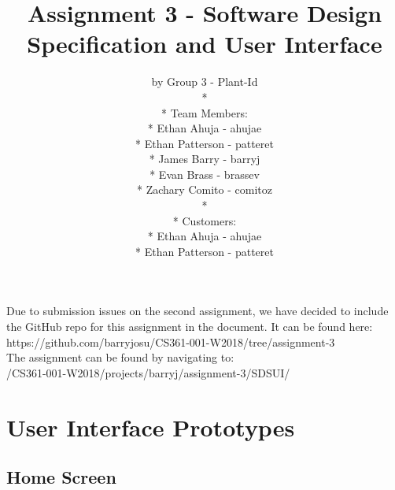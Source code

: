\documentclass[a4paper]{article}
\title{Assignment 3 - Software Design Specification and User Interface}
\author{ by Group 3 - Plant-Id \\* \\* Team Members: \\* Ethan Ahuja - ahujae \\* Ethan Patterson - patteret \\* James Barry - barryj \\* Evan Brass - brassev \\* Zachary Comito - comitoz \\* \\* Customers: \\* Ethan Ahuja - ahujae \\* Ethan Patterson - patteret }
\begin{document}
\maketitle
\pagebreak
\tableofcontents
\pagebreak
Due to submission issues on the second assignment, we have decided to include the GitHub repo for this assignment in the document. It can be found here: \\ https://github.com/barryjosu/CS361-001-W2018/tree/assignment-3 \\ The assignment can be found by navigating to: \\ /CS361-001-W2018/projects/barryj/assignment-3/SDSUI/
\section{User Interface Prototypes}
\subsection{Home Screen}
\end{document}
